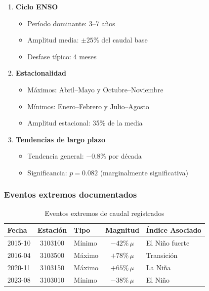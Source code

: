 \begin{enumerate}
    \item \textbf{Ciclo ENSO}
    \begin{itemize}
        \item Período dominante: 3--7 años
        \item Amplitud media: $\pm 25\%$ del caudal base
        \item Desfase típico: 4 meses
    \end{itemize}

    \item \textbf{Estacionalidad}
    \begin{itemize}
        \item Máximos: Abril--Mayo y Octubre--Noviembre
        \item Mínimos: Enero--Febrero y Julio--Agosto
        \item Amplitud estacional: 35\% de la media
    \end{itemize}

    \item \textbf{Tendencias de largo plazo}
    \begin{itemize}
        \item Tendencia general: $-0.8\%$ por década
        \item Significancia: $p = 0.082$ (marginalmente significativa)
    \end{itemize}
\end{enumerate}

\subsubsection{Eventos extremos documentados}

\begin{table}[h]
\centering
\begin{tabular}{l c l c l}
\hline
\textbf{Fecha} & \textbf{Estación} & \textbf{Tipo} & \textbf{Magnitud} & \textbf{Índice Asociado} \\
\hline
2015-10 & 3103100 & Mínimo & $-42\%\,\mu$ & El Niño fuerte \\
2016-04 & 3103500 & Máximo & $+78\%\,\mu$ & Transición \\
2020-11 & 3103150 & Máximo & $+65\%\,\mu$ & La Niña \\
2023-08 & 3103010 & Mínimo & $-38\%\,\mu$ & El Niño \\
\hline
\end{tabular}
\caption{Eventos extremos de caudal registrados}
\end{table}

